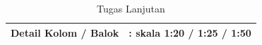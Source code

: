 \documentclass[../main.tex]{subfiles}
\begin{document}
\begin{frame}[mytitle=standard,c,mycolor=digiPH_uniblue,light]

	\begin{table}
		\caption{Tugas Lanjutan}\label{tab:}
		\begin{center}
			\begin{tabular}[c]{lp{}}
				\hline

				Detail Kolom / Balok & : skala 1:20 / 1:25 / 1:50 \\
				\hline
			\end{tabular}
		\end{center}
	\end{table}
\end{frame}



\end{document}

